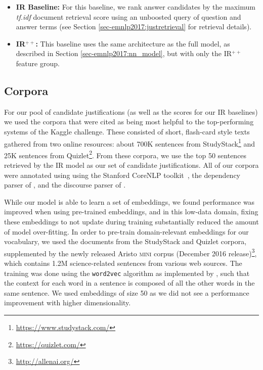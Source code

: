 \begin{itemize}
\item \textbf{IR Baseline:} For this baseline, we rank answer candidates by the maximum \emph{tf.idf} document retrieval score using an unboosted query of question and answer terms (see Section \ref{sec-emnlp2017:justretrieval} for retrieval details).

\item \textbf{IR$^{++}$:}  This baseline uses the same architecture as the full model, as described in Section \ref{sec-emnlp2017:nn_model}, but with only the IR$^{++}$ feature group.
\end{itemize}

\subsection{Corpora}
For our pool of candidate justifications (as well as the scores for our IR baselines) we used the corpora that were cited as being most helpful to the top-performing systems of the Kaggle challenge.  These consisted of short, flash-card style texts gathered from two online resources:  about 700K sentences from StudyStack\footnote{{\scriptsize \url{https://www.studystack.com/}}} and 25K sentences from Quizlet\footnote{{\scriptsize \url{https://quizlet.com/}}}.
From these corpora, we use the top 50 sentences retrieved by the IR model as our set of candidate justifications.  All of our corpora were annotated using using the Stanford CoreNLP toolkit~\citep{manning2014stanford}, the dependency parser of \citet{chen2014fast}, and the discourse parser of \citet{Surdeanu:15}.

While our model is able to learn a set of embeddings, we found performance was improved when using pre-trained embeddings, and in this low-data domain, fixing these embeddings to not update during training substantially reduced the amount of model over-fitting.   In order to pre-train domain-relevant embeddings for our vocabulary, we used the documents from the StudyStack and Quizlet corpora, supplemented by the newly released Aristo \textsc{mini} corpus (December 2016 release)\footnote{{\scriptsize \url{http://allenai.org/}}}, which contains 1.2M science-related sentences from various web sources.  The training was done using the \texttt{word2vec} algorithm \citep{mikolov10, mikolov13} as implemented by \citet{levy2014dependency}, such that the context for each word in a sentence is composed of all the other words in the same sentence.  We used embeddings of size 50 as we did not see a performance improvement with higher dimensionality.

